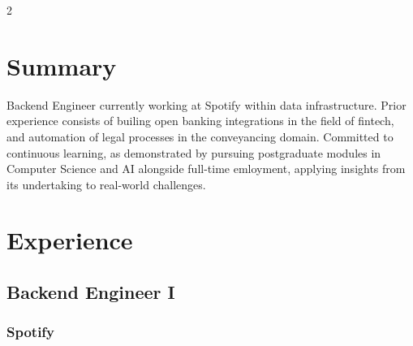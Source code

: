 \documentclass{article}
\begin{document}
\begin{paracol}{2}
  \section{Summary}
  Backend Engineer currently working at Spotify within data infrastructure. Prior experience consists of builing open banking integrations in the field of fintech, and automation of legal processes in the conveyancing domain. Committed to continuous learning, as demonstrated by pursuing postgraduate modules in Computer Science and AI alongside full-time emloyment, applying insights from its undertaking to real-world challenges.
  \raggedright
  \vspace{3pt}
  \section{Experience}
  \subsection{Backend Engineer I}
  \subsubsection{Spotify}
  {\color{LightGrey}\scriptsize\href{https://www.spotify.com/uk/about-us/contact/}{\faExternalLink}}
  {\color{TitleGrey}{\small an audio streaming and media service provider.}}
  \hspace*{\fill}{\color{TitleGrey}{\scriptsize\faCalendar}\hspace{5pt}{\small06/2025 -- Present}}


\end{paracol}
\end{document}
